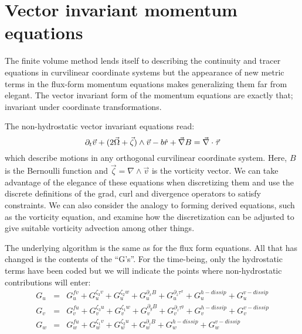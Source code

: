 
\section{Vector invariant momentum equations}

The finite volume method lends itself to describing the continuity and
tracer equations in curvilinear coordinate systems but the appearance
of new metric terms in the flux-form momentum equations makes
generalizing them far from elegant. The vector invariant form of the
momentum equations are exactly that; invariant under coordinate
transformations.

The non-hydrostatic vector invariant equations read:
\begin{equation}
\partial_t \vec{v} + ( 2\vec{\Omega} + \vec{\zeta}) \wedge \vec{v}
- b \hat{r}
+ \vec{\nabla} B = \vec{\nabla} \cdot \vec{\bf \tau}
\end{equation}
which describe motions in any orthogonal curvilinear coordinate
system. Here, $B$ is the Bernoulli function and $\vec{\zeta}=\nabla
\wedge \vec{v}$ is the vorticity vector. We can take advantage of the
elegance of these equations when discretizing them and use the
discrete definitions of the grad, curl and divergence operators to
satisfy constraints. We can also consider the analogy to forming
derived equations, such as the vorticity equation, and examine how the
discretization can be adjusted to give suitable vorticity advection
among other things.

The underlying algorithm is the same as for the flux form
equations. All that has changed is the contents of the ``G's''. For
the time-being, only the hydrostatic terms have been coded but we will
indicate the points where non-hydrostatic contributions will enter:
\begin{eqnarray}
G_u & = & G_u^{fv} + G_u^{\zeta_3 v} + G_u^{\zeta_2 w} + G_u^{\partial_x B}
+ G_u^{\partial_z \tau^x} + G_u^{h-dissip} + G_u^{v-dissip} \\
G_v & = & G_v^{fu} + G_v^{\zeta_3 u} + G_v^{\zeta_1 w} + G_v^{\partial_y B}
+ G_v^{\partial_z \tau^y} + G_v^{h-dissip} + G_v^{v-dissip} \\
G_w & = & G_w^{fu} + G_w^{\zeta_1 v} + G_w^{\zeta_2 u} + G_w^{\partial_z B}
+ G_w^{h-dissip} + G_w^{v-dissip}
\end{eqnarray}



